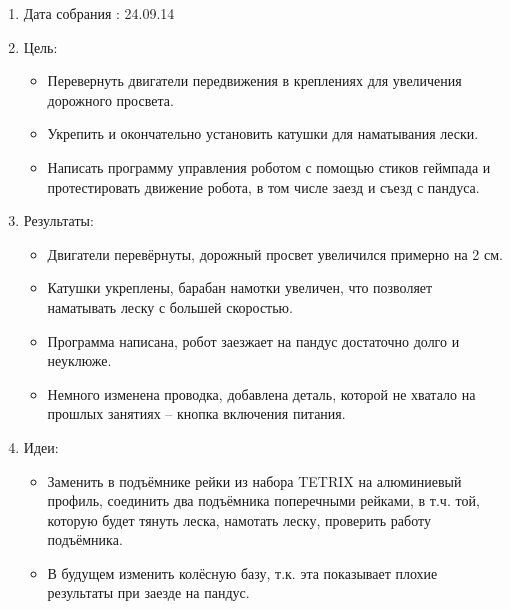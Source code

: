 
	\begin{enumerate}
		\item Дата собрания : 24.09.14
		\item Цель:
		\begin{itemize}
			\item Перевернуть двигатели передвижения в креплениях для увеличения дорожного просвета.
			\item Укрепить и окончательно установить катушки для наматывания лески.
			\item Написать программу управления роботом с помощью стиков геймпада и протестировать движение робота, в том числе заезд и съезд с пандуса.
		\end{itemize}
		\item Результаты:
		\begin{itemize}
			\item Двигатели перевёрнуты, дорожный просвет увеличился примерно на 2 см.
			\item Катушки укреплены, барабан намотки увеличен, что позволяет наматывать леску с большей скоростью.
			\item Программа написана, робот заезжает на пандус достаточно долго и неуклюже.
			\item Немного изменена проводка, добавлена деталь, которой не хватало на прошлых занятиях – кнопка включения питания.
		\end{itemize}	
		\item Идеи:
		\begin{itemize}
			\item Заменить в подъёмнике рейки из набора TETRIX на алюминиевый профиль, соединить два подъёмника поперечными рейками, в т.ч. той, которую будет тянуть леска, намотать леску, проверить работу подъёмника.
			\item В будущем изменить колёсную базу, т.к. эта показывает плохие результаты при заезде на пандус.
		\end{itemize}
	\end{enumerate}
